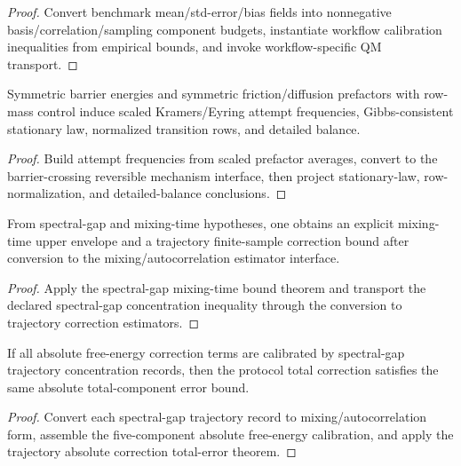 \begin{proof}
Convert benchmark mean/std-error/bias fields into nonnegative basis/correlation/sampling component budgets, instantiate workflow calibration inequalities from empirical bounds, and invoke workflow-specific QM transport.
\end{proof}

\begin{theorem}\label{thm:potential-landscape-barrier-kinetics-bundle}
Symmetric barrier energies and symmetric friction/diffusion prefactors with row-mass control induce scaled Kramers/Eyring attempt frequencies, Gibbs-consistent stationary law, normalized transition rows, and detailed balance.
\end{theorem}

\begin{proof}
Build attempt frequencies from scaled prefactor averages, convert to the barrier-crossing reversible mechanism interface, then project stationary-law, row-normalization, and detailed-balance conclusions.
\end{proof}

\begin{theorem}\label{thm:spectral-gap-trajectory-concentration-bundle}
From spectral-gap and mixing-time hypotheses, one obtains an explicit mixing-time upper envelope and a trajectory finite-sample correction bound after conversion to the mixing/autocorrelation estimator interface.
\end{theorem}

\begin{proof}
Apply the spectral-gap mixing-time bound theorem and transport the declared spectral-gap concentration inequality through the conversion to trajectory correction estimators.
\end{proof}

\begin{theorem}\label{thm:spectral-gap-absolute-free-energy-total-error}
If all absolute free-energy correction terms are calibrated by spectral-gap trajectory concentration records, then the protocol total correction satisfies the same absolute total-component error bound.
\end{theorem}

\begin{proof}
Convert each spectral-gap trajectory record to mixing/autocorrelation form, assemble the five-component absolute free-energy calibration, and apply the trajectory absolute correction total-error theorem.
\end{proof}

